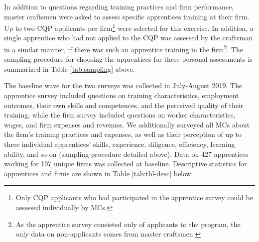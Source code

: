 \documentclass[
  11pt,
a4paper
]{article}
\begin{document}
\noindent In addition to questions regarding training practices and firm performance, master craftsmen were asked to assess specific apprentices training at their firm. Up to two CQP applicants per firm\footnote{Only CQP applicants who had participated in the apprentice survey could be assessed individually by MCs.} were selected for this exercise. In addition, a single apprentice who had not applied to the CQP was assessed by the craftsman in a similar manner, if there was such an apprentice training in the firm\footnote{As the apprentice survey consisted only of applicants to the program, the only data on non-applicants comes from master craftsmen.}. The sampling procedure for choosing the apprentices for these personal assessments is summarized in Table \ref{tab:sampling} above.

The baseline wave for the two surveys was collected in July-August 2019. The apprentice survey included questions on training characteristics, employment outcomes, their own skills and competences, and the perceived quality of their training, while the firm survey included questions on worker characteristics, wages, and firm expenses and revenues. We additionally surveyed all MCs about the firm's training practices and expenses, as well as their perception of up to three individual apprentices' skills, experience, diligence, efficiency, learning ability, and so on (sampling procedure detailed above). Data on 427 apprentices working for 197 unique firms was collected at baseline. Descriptive statistics for apprentices and firms are shown in Table \ref{tab:tbl-desc} below.
\end{document}
